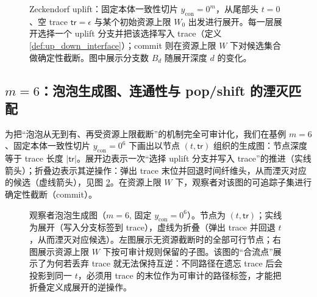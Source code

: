 \begin{figure}[H]
\centering

\caption{Zeckendorf uplift：固定本体一致性切片 \(y_{\mathrm{con}}=0^m\)，从尾部头 \(t=0\)、空 trace \(\mathsf{tr}=\epsilon\) 与某个初始资源上限 \(W_0\) 出发进行展开。每一层展开选择一个 uplift 分支并把该选择写入 trace（定义 \ref{def:up_down_interface}）；commit 则在资源上限 \(W\) 下对候选集合做确定性截断。图中展示分支数 \(B_d\) 随展开深度 \(d\) 的变化。}
\label{fig:zeckendorf_energy_beam_uplift_curve}
\end{figure}

\begin{table}[H]
\centering
\small
\setlength{\tabcolsep}{6pt}

\caption{不同 \(m\) 的尾部长度 \(L(m)=K(m)-m\) 与资源上限 \(W\) 下的终端分支数摘要（由脚本生成）。}
\label{tab:zeckendorf_energy_beam_uplift}
\end{table}

\subsection{\texorpdfstring{$m=6$}{m=6}：泡泡生成图、连通性与 pop/shift 的湮灭匹配}
为把“泡泡从无到有、再受资源上限截断”的机制完全可审计化，我们在基例 \(m=6\)、固定本体一致性切片 \(y_{\mathrm{con}}=0^6\) 下画出以节点 \((t,\mathsf{tr})\) 组织的生成图：节点深度等于 trace 长度 \(|\mathsf{tr}|\)。展开边表示一次“选择 uplift 分支并写入 trace”的推进（实线箭头）；折叠边表示其逆操作：弹出 trace 末位并回退时间纤维头，从而湮灭对应的候选（虚线箭头），见图 \ref{fig:observer_bubble_graph_m6}。在资源上限 \(W\) 下，观察者对该图的可追踪子集进行确定性截断（commit）。

\begin{figure}[H]
\centering

\caption{观察者泡泡生成图（\(m=6\), 固定 \(y_{\mathrm{con}}=0^6\)）。节点为 \((t,\mathsf{tr})\)；实线为展开（写入分支标签到 trace），虚线为折叠（弹出 trace 并回退 \(t\)，从而湮灭对应候选）。左图展示无资源截断时的全部可行节点；右图展示资源上限 \(W\) 下按可审计规则保留的子图。该图的“合流点”展示了为何若丢弃 trace 就无法保持互逆：不同路径在遗忘 trace 后会投影到同一 \(t\)，必须用 trace 的末位作为可审计的路径标签，才能把折叠定义成展开的逆操作。}
\label{fig:observer_bubble_graph_m6}
\end{figure}

\begin{table}[H]
\centering
\small
\setlength{\tabcolsep}{8pt}

\caption{自动检出的合流证据（\(m=6\), 固定 \(y_{\mathrm{con}}=0^6\)）：（i）存在一个深度 \(d\) 与一个尾部头 \(t\)，使得（ii）两条不同 trace \(\mathsf{tr}_0\neq \mathsf{tr}_1\) 的节点 \((t,\mathsf{tr}_0)\)、\((t,\mathsf{tr}_1)\) 同时可达；因此（iii）遗忘 trace 的投影 \(\pi(t,\mathsf{tr})=t\) 不是单射，从而仅凭 \(t\) 不可能形成可逆动力学。该证据与命题 \ref{prop:log_needed_for_reversibility} 对齐：要把折叠定义为展开的逆，必须在折叠步中对 trace 末位执行 pop 匹配。}
\label{tab:m6_confluence_example}
\end{table}

